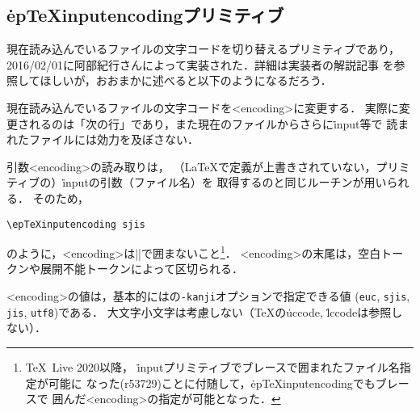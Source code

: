 \documentclass[a4paper,11pt,nomag,dvipdfmx]{jsarticle}
\begin{document}
\subsection{\.{epTeXinputencoding}プリミティブ}
現在読み込んでいるファイルの文字コードを切り替えるプリミティブであり，
2016/02/01に阿部紀行さんによって実装された．詳細は実装者の解説記事
\cite{eptexinputenc}を参照してほしいが，おおまかに述べると以下のようになるだろう．

\begin{cslist}
  現在読み込んでいるファイルの文字コードを<encoding>に変更する．
  実際に変更されるのは「次の行」であり，また現在のファイルからさらに\.{input}等で
  読まれたファイルには効力を及ぼさない．

  引数<encoding>の読み取りは，
  （\LaTeX で定義が上書きされていない，プリミティブの）\.{input}の引数（ファイル名）を
  取得するのと同じルーチンが用いられる．
  そのため，
\begin{verbatim}
\epTeXinputencoding sjis
\end{verbatim}
  のように，<encoding>は|{}|で囲まないこと\footnote{\TeX~Live 2020以降，
  \.{input}プリミティブでブレースで囲まれたファイル名指定が可能に
  なった(r53729)ことに付随して，\.{epTeXinputencoding}でもブレースで
  囲んだ<encoding>の指定が可能となった．}．
  <encoding>の末尾は，空白トークンや展開不能トークンによって区切られる．

  <encoding>の値は，基本的には\pTeX の\texttt{-kanji}オプションで指定できる値
  (\texttt{euc}, \texttt{sjis}, \texttt{jis}, \texttt{utf8})である．
  大文字小文字は考慮しない（\TeX の\.{uccode}, \.{lccode}は参照しない）．
\end{cslist}
\end{document}

